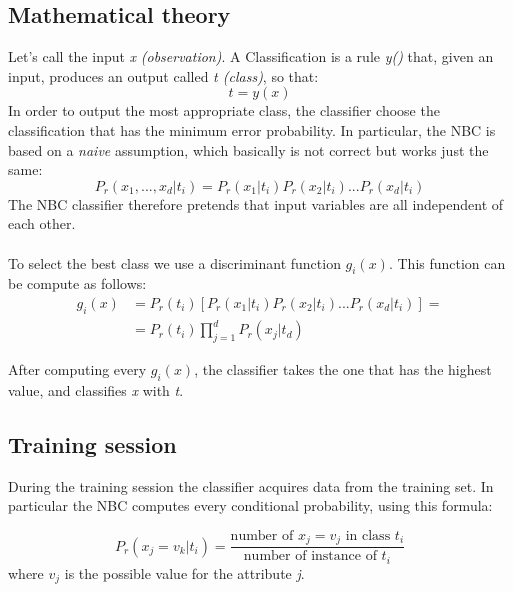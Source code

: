 \documentclass[10pt]{article}
\begin{document}
\subsection{Mathematical theory}
Let’s call the input \textit{x} \textit{(observation)}. A Classification is a rule
\textit{y()} that, given an input, produces an output called \textit{t (class)}, so that:
\begin{equation}
    t = y(x) 
\end{equation}
In order to output the most appropriate class, the classifier choose the classification that has the minimum error probability. In particular, the NBC is based on a \textit{naive} assumption,
which basically is not correct but works just the same:
\begin{equation}
    P_r(x_1, ..., x_d | t_i) = P_r(x_1|t_i)P_r(x_2|t_i) ... P_r(x_d|t_i)
\end{equation}
The NBC classifier therefore pretends that input variables are
all independent of each other. \\\\
To select the best class we use a discriminant function \textit{$g_i(x)$}.
This function can be compute as follows:
\begin{equation}\label{e:barwq}\begin{split}
    g_i(x)& = P_r(t_i)[P_r(x_1|t_i)P_r(x_2|t_i) ... P_r(x_d|t_i)] = \\
   & = P_r(t_i) \prod_{j=1}^{d}P_r(x_j|t_d)
\end{split}\end{equation}

After computing every \textit{$g_i(x)$}, the classifier takes the one
that has the highest value, and classifies \textit{x} with \textit{t}.
\subsection{Training session}
During the training session the classifier acquires data
from the training set. In particular the NBC computes every
conditional probability, using this formula:

\begin{equation}
     P_r(x_j = v_k|t_i) = \frac{\text{number of $x_j = v_j$ in class $t_i$}}{\text{number of instance of $t_i$}}
\end{equation}
where $v_j$ is the possible value for the attribute \textit{j}.
\end{document}
